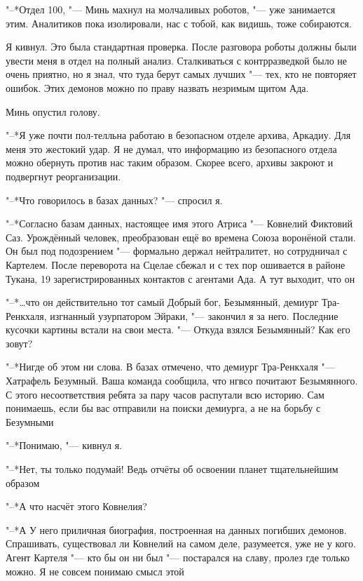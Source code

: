 \documentclass[a4paper,10pt]{book}
\newcommand{\ldotst}{\so{...}\xspace}
\begin{document}
"--*Отдел 100, "--- Минь махнул на молчаливых роботов, "--- уже занимается 
этим. 
Аналитиков пока изолировали, нас с тобой, как видишь, тоже собираются.

Я кивнул. Это была стандартная проверка. После разговора роботы должны были 
увести меня в отдел на полный анализ. Сталкиваться с контрразведкой было не 
очень приятно, но я знал, что туда берут самых лучших "--- тех, кто не 
повторяет 
ошибок. Этих демонов можно по праву назвать незримым щитом Ада.

Минь опустил голову.

"--*Я уже почти пол-телльна работаю в безопасном отделе архива, Аркадиу. Для 
меня это жестокий удар. Я не думал, что информацию из безопасного отдела можно 
обернуть против нас таким образом. Скорее всего, архивы закроют и подвергнут 
реорганизации.

"--*Что говорилось в базах данных? "--- спросил я.

"--*Согласно базам данных, настоящее имя этого Атриса "--- Ковнелий Фиктовий 
Саз. Урождённый человек, преобразован ещё во времена Союза воронёной стали. Он 
был под подозрением "--- формально держал нейтралитет, но сотрудничал с 
Картелем. После переворота на Сцелае сбежал и с тех пор ошивается в районе 
Тукана, 19 зарегистрированных контактов с агентами Ада. А тут выходит, что 
он\ldotst

"--*\ldots что он действительно тот самый Добрый бог, Безымянный, демиург 
Тра-Ренкхаля, изгнанный узурпатором Эйраки, "--- закончил я за него. Последние 
кусочки картины встали на свои места. "--- Откуда взялся Безымянный? Как его 
зовут?

"--*Нигде об этом ни слова. В базах отмечено, что демиург Тра-Ренкхаля "--- 
Хатрафель Безумный. Ваша команда сообщила, что нгвсо почитают Безымянного. С 
этого несоответствия ребята за пару часов распутали всю историю. Сам понимаешь, 
если бы вас отправили на поиски демиурга, а не на борьбу с Безумными\ldotst

"--*Понимаю, "--- кивнул я.

"--*Нет, ты только подумай! Ведь отчёты об освоении планет тщательнейшим 
образом\ldotst

"--*А что насчёт этого Ковнелия?

"--*А\ldotst У него приличная биография, построенная на данных погибших 
демонов. 
Спрашивать, существовал ли Ковнелий на самом деле, разумеется, уже не у кого. 
Агент Картеля "--- кто бы он ни был "--- постарался на славу, пролез где только 
можно. Я не совсем понимаю смысл этой\ldotst
\end{document}
